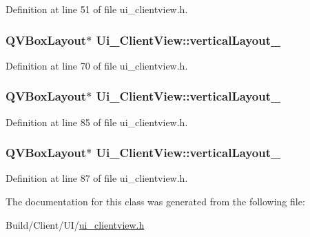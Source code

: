 Definition at line 51 of file ui\+\_\+clientview.\+h.

\hypertarget{class_ui___client_view_a3398ddbbfccc42f0427b2f58894fc727}{}
\subsubsection[{vertical\+Layout\+\_\+7}]{\setlength{\rightskip}{0pt plus 5cm}Q\+V\+Box\+Layout$\ast$ Ui\+\_\+\+Client\+View\+::vertical\+Layout\+\_}\label{class_ui___client_view_a3398ddbbfccc42f0427b2f58894fc727}


Definition at line 70 of file ui\+\_\+clientview.\+h.

\hypertarget{class_ui___client_view_ad1037c40aae069d817bda2d6b37e7cd8}{}
\subsubsection[{vertical\+Layout\+\_\+8}]{\setlength{\rightskip}{0pt plus 5cm}Q\+V\+Box\+Layout$\ast$ Ui\+\_\+\+Client\+View\+::vertical\+Layout\+\_}\label{class_ui___client_view_ad1037c40aae069d817bda2d6b37e7cd8}


Definition at line 85 of file ui\+\_\+clientview.\+h.

\hypertarget{class_ui___client_view_a65f193067cb20dcfde40c2fa94d50bc9}{}
\subsubsection[{vertical\+Layout\+\_\+9}]{\setlength{\rightskip}{0pt plus 5cm}Q\+V\+Box\+Layout$\ast$ Ui\+\_\+\+Client\+View\+::vertical\+Layout\+\_}\label{class_ui___client_view_a65f193067cb20dcfde40c2fa94d50bc9}


Definition at line 87 of file ui\+\_\+clientview.\+h.



The documentation for this class was generated from the following file\+:\begin{DoxyCompactItemize}
\item 
Build/\+Client/\+U\+I/\hyperlink{ui__clientview_8h}{ui\+\_\+clientview.\+h}\end{DoxyCompactItemize}
